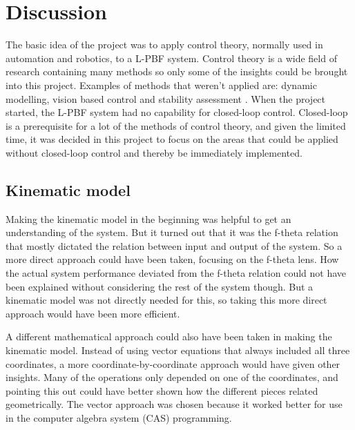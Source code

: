 \chapter{Discussion}

The basic idea of the project was to apply control theory, normally used in automation and robotics, to a L-PBF system. Control theory is a wide field of research containing many methods so only some of the insights could be brought into this project. Examples of methods that weren't applied are: dynamic modelling, vision based control and stability assessment \cite{robot-control}. When the project started, the L-PBF system had no capability for closed-loop control. Closed-loop is a prerequisite for a lot of the methods of control theory, and given the limited time, it was decided in this project to focus on the areas that could be applied without closed-loop control and thereby be immediately implemented.

\section{Kinematic model}

Making the kinematic model in the beginning was helpful to get an understanding of the system. But it turned out that it was the f-theta relation that mostly dictated the relation between input and output of the system. So a more direct approach could have been taken, focusing on the f-theta lens. How the actual system performance deviated from the f-theta relation could not have been explained without considering the rest of the system though. But a kinematic model was not directly needed for this, so taking this more direct approach would have been more efficient.

A different mathematical approach could also have been taken in making the kinematic model. Instead of using vector equations that always included all three coordinates, a more coordinate-by-coordinate approach would have given other insights. Many of the operations only depended on one of the coordinates, and pointing this out could have better shown how the different pieces related geometrically. The vector approach was chosen because it worked better for use in the computer algebra system (CAS) programming.

